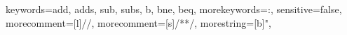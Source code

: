 {
    keywords={add, adds, sub, subs, b, bne, beq},
    morekeywords={:},
    sensitive=false,
    morecomment=[l]{//},
    morecomment=[s]{/*}{*/},
    morestring=[b]",
}

